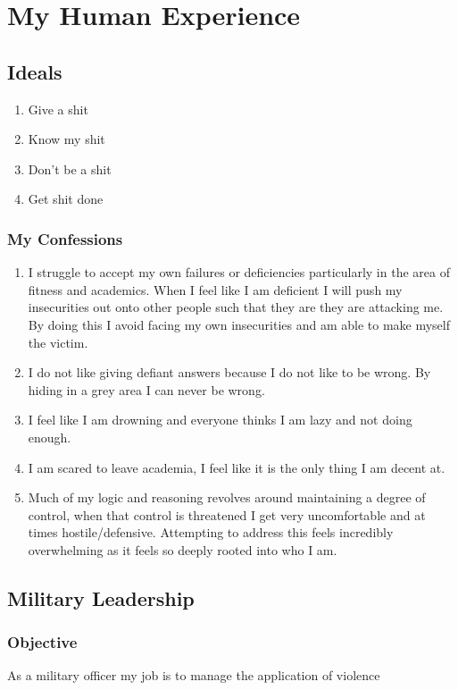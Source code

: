 \chapter{My Human Experience}

\section{Ideals}

\begin{enumerate}
    \item Give a shit
    \item Know my shit
    \item Don't be a shit
    \item Get shit done
\end{enumerate}

\subsection{My Confessions}
\begin{enumerate}
    \item I struggle to accept my own failures or deficiencies particularly in the area of fitness and academics. When I feel like I am deficient I will push my insecurities out onto other people such that they are they are attacking me. By doing this I avoid facing my own insecurities and am able to make myself the victim. 
    \item I do not like giving defiant answers because I do not like to be wrong. By hiding in a grey area I can never be wrong.
    \item I feel like I am drowning and everyone thinks I am lazy and not doing enough. 
    \item I am scared to leave academia, I feel like it is the only thing I am decent at. 
    \item Much of my logic and reasoning revolves around maintaining a degree of control, when that control is threatened I get very uncomfortable and at times hostile/defensive. Attempting to address this feels incredibly overwhelming as it feels so deeply rooted into who I am.
\end{enumerate}

\section{Military Leadership}
\subsection{Objective}
As a military officer my job is to manage the application of violence

